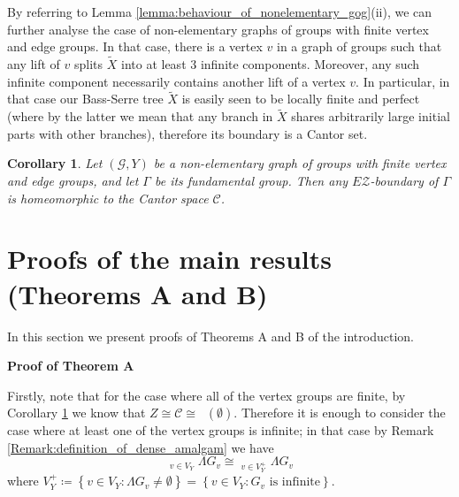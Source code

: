 \documentclass[12pt, a4paper]{article}
\newcommand{\8}{\infty}
\newcommand{\set}[1]{\left\{ #1 \right\}}
\theoremstyle{break}
\newtheorem{thm}{Theorem}[section]
\newtheorem{cor}[thm]{Corollary}
\theoremstyle{defbreak}
\newcommand{\ol}[1]{\overline{#1}}
\newcommand{\wtl}[1]{\widetilde{#1}}
\DeclareMathOperator*{\damalgam}{\widetilde{\bigsqcup}}
\newcounter{todocounter}
\newcommand{\todo}{\textcolor{red}{\textbf{TODO \thetodocounter} \addtocounter{todocounter}{1}}}
\begin{document}
By referring to Lemma \ref{lemma:behaviour_of_nonelementary_gog}(ii), we can further analyse the case of non-elementary graphs of groups with finite vertex and edge groups. In that case, there is a vertex $v$ in a graph of groups such that any lift of $v$ splits $\wtl{X}$ into at least $3$ infinite components. Moreover, any  such infinite component necessarily contains another lift of a vertex $v$. In particular, in that case our Bass-Serre tree $\wtl{X}$ is easily seen to be locally finite and perfect (where by the latter we mean that any branch in $\wtl{X}$ shares arbitrarily large initial parts with other branches), therefore its boundary is a Cantor set.\medskip 

\begin{cor}\label{corollary:all_vertex_groups_finite}
    Let $(\mathcal{G},Y)$ be a non-elementary graph of groups with finite vertex and edge groups, and let $\Gamma$ be its fundamental group. Then any $E\mathcal{Z}$-boundary of $\Gamma$ is homeomorphic to the Cantor space $\mathcal{C}$.
\end{cor}

\section{Proofs of the main results (Theorems A and B)}\label{Section:main_result}

In this section we present proofs of Theorems A and B of the introduction. 
\medskip


\noindent
{\bf Proof of Theorem A}

    Firstly, note that for the case where all of the vertex groups are finite, by Corollary \ref{corollary:all_vertex_groups_finite} we know that $Z\cong \mathcal{C} \cong \damalgam(\emptyset)$. Therefore it is enough to consider the case where at least one of the vertex groups is infinite; in that case by Remark \ref{Remark:definition_of_dense_amalgam} we have
    $$\damalgam_{v\in V_Y}\Lambda G_v \cong \damalgam_{v\in V_Y^+}\Lambda G_v$$
    where $V_Y^+ \coloneqq \set{v\in V_Y: \Lambda G_v\neq \emptyset} = \set{v\in V_Y: G_v\text{ is infinite}}$. 
    
\end{document}

